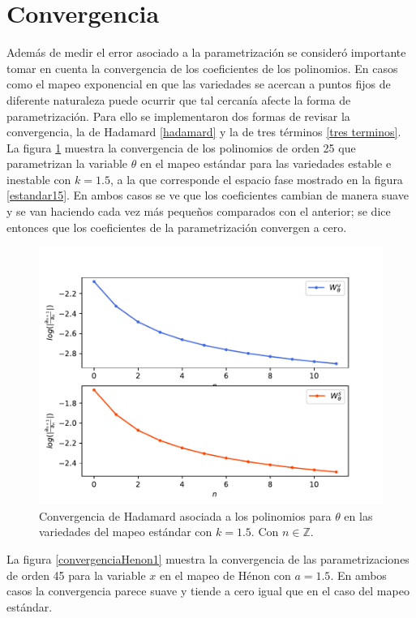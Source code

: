 \section{Convergencia}
Además de medir el error asociado a la parametrización se consideró importante tomar en cuenta la convergencia de los coeficientes de los polinomios. En casos como el mapeo exponencial en que las variedades se acercan a puntos fijos de diferente naturaleza puede ocurrir que tal cercanía afecte la forma de parametrización. Para ello se implementaron dos formas de revisar la convergencia, la de Hadamard \eqref{hadamard} y la de tres términos \eqref{tres terminos}. \\

La figura \ref{convergenciaEst15} muestra la convergencia de los polinomios de orden 25 que parametrizan la variable $\theta$ en el mapeo estándar para las variedades estable e inestable con $k=1.5$, a la que corresponde el espacio fase mostrado en la figura \ref{estandar15}. En ambos casos se ve que los coeficientes cambian de manera suave y se van haciendo cada vez más pequeños comparados con el anterior; se dice entonces que los coeficientes de la parametrización convergen a cero.  
\begin{figure}[H]
\centering
\includegraphics[scale=0.8]{converEst15}
\caption{Convergencia de Hadamard asociada a los polinomios para $\theta$ en las variedades del mapeo estándar con $k=1.5$. Con $n\in\mathbb{Z}$.}
\label{convergenciaEst15}
\end{figure}

La figura \ref{convergenciaHenon1} muestra la convergencia de las parametrizaciones de orden 45 para la variable $x$ en el mapeo de Hénon con $a=1.5$. En ambos casos la convergencia parece suave y tiende a cero igual que en el caso del mapeo estándar.

